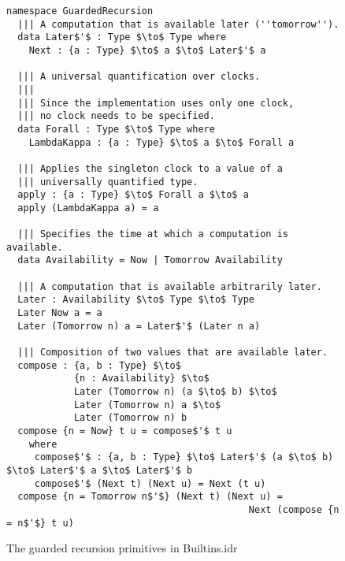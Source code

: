 \begin{figure}[h]
  \begin{lstlisting}[mathescape]
namespace GuardedRecursion
  ||| A computation that is available later (''tomorrow'').
  data Later$'$ : Type $\to$ Type where
    Next : {a : Type} $\to$ a $\to$ Later$'$ a

  ||| A universal quantification over clocks.
  |||
  ||| Since the implementation uses only one clock,
  ||| no clock needs to be specified.
  data Forall : Type $\to$ Type where
    LambdaKappa : {a : Type} $\to$ a $\to$ Forall a
 
  ||| Applies the singleton clock to a value of a
  ||| universally quantified type.
  apply : {a : Type} $\to$ Forall a $\to$ a
  apply (LambdaKappa a) = a 

  ||| Specifies the time at which a computation is available.
  data Availability = Now | Tomorrow Availability

  ||| A computation that is available arbitrarily later.
  Later : Availability $\to$ Type $\to$ Type
  Later Now a = a
  Later (Tomorrow n) a = Later$'$ (Later n a)
  
  ||| Composition of two values that are available later.                             
  compose : {a, b : Type} $\to$ 
            {n : Availability} $\to$ 
            Later (Tomorrow n) (a $\to$ b) $\to$ 
            Later (Tomorrow n) a $\to$ 
            Later (Tomorrow n) b
  compose {n = Now} t u = compose$'$ t u
    where
     compose$'$ : {a, b : Type} $\to$ Later$'$ (a $\to$ b) $\to$ Later$'$ a $\to$ Later$'$ b
     compose$'$ (Next t) (Next u) = Next (t u)
  compose {n = Tomorrow n$'$} (Next t) (Next u) = 
                                           Next (compose {n = n$'$} t u)
\end{lstlisting}
  \caption{The guarded recursion primitives in Builtins.idr}
  \label{fig:guarded_recursion_primitives}
\end{figure}


